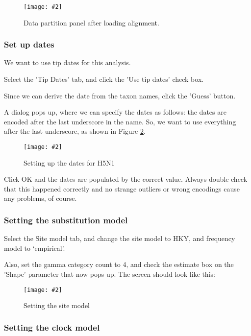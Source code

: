 \documentclass{article}
\newcommand{\includeimage}[2][]{%
\texttt{[image: \#2]}
}
\begin{document}
\begin{figure}
\centering	
\includeimage[scale=0.3,clip=true,trim=0 400 0 0]{figures/BEAUti_DataPartitions}
\caption{Data partition panel after loading alignment.}
\label{fig.datapartition} 
\end{figure}

\subsubsection*{Set up dates}

We want to use tip dates for this analysis.

Select the 'Tip Dates' tab, and click the 'Use tip dates' check box.

Since we can derive the date from the taxon names, click the 'Guess' button.

A dialog pops up, where we can specify the dates as follows: the dates are encoded after the last underscore in the name.
So, we want to use everything after the last underscore, as shown in Figure \ref{fig.dates}.

\begin{figure}
\centering	
\includeimage[scale=0.3]{figures/BEAUti_dates}
\caption{Setting up the dates for H5N1}
\label{fig.dates}
\end{figure}

Click OK and the dates are populated by the correct value. Always double check that this happened correctly and no strange outliers or wrong encodings cause any problems, of course.

\subsubsection*{Setting the substitution model}

Select the Site model tab, and change the site model to HKY, and frequency model to `empirical'.

Also, set the gamma category count to 4, and check the estimate box on the 'Shape' parameter that now pops up.
The screen should look like this:

\begin{figure}
\centering	
\includeimage[scale=0.3,clip=true,trim=0 400 0 0]{figures/BEAUti_sitemodel}
\caption{Setting the site model}
\label{fig.BEAUti_sitemodel}
\end{figure}

\subsubsection*{Setting the clock model}
\end{document}
